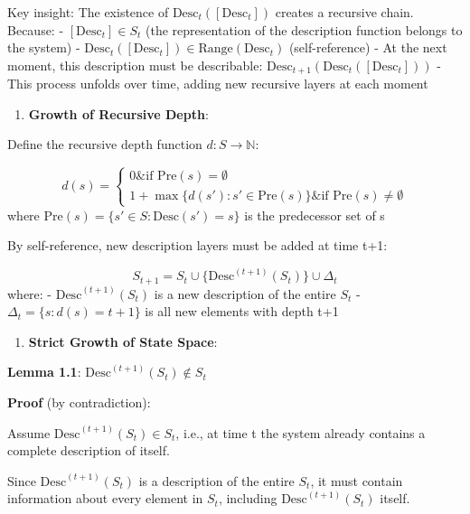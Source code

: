  Key insight: The existence of $\text{Desc}_t([\text{Desc}_t])$ creates a recursive chain. Because:
  - $[\text{Desc}_t] \in S_t$ (the representation of the description function belongs to the system)
  - $\text{Desc}_t([\text{Desc}_t]) \in \text{Range}(\text{Desc}_t)$ (self-reference)
  - At the next moment, this description must be describable: $\text{Desc}_{t+1}(\text{Desc}_t([\text{Desc}_t]))$
  - This process unfolds over time, adding new recursive layers at each moment

\begin{enumerate}
\item \textbf{Growth of Recursive Depth}:
\end{enumerate}
  Define the recursive depth function $d: S \to \mathbb{N}$:
  
\begin{equation}
d(s) = \begin{cases}
0 \& \text{if } \text{Pre}(s) = \emptyset \\
1 + \max\{d(s'): s' \in \text{Pre}(s)\} \& \text{if } \text{Pre}(s) \neq \emptyset
\end{cases}
\end{equation}
  where $\text{Pre}(s) = \{s' \in S: \text{Desc}(s') = s\}$ is the predecessor set of s
  
  By self-reference, new description layers must be added at time t+1:
  
\begin{equation}
S_{t+1} = S_t \cup \{\text{Desc}^{(t+1)}(S_t)\} \cup \Delta_t
\end{equation}
  where:
  - $\text{Desc}^{(t+1)}(S_t)$ is a new description of the entire $S_t$
  - $\Delta_t = \{s: d(s) = t+1\}$ is all new elements with depth t+1
  
\begin{enumerate}
\item \textbf{Strict Growth of State Space}:
\end{enumerate}
  \textbf{Lemma 1.1}: $\text{Desc}^{(t+1)}(S_t) \notin S_t$
\label{lem:1.1}
  
  \textbf{Proof} (by contradiction):
  
  Assume $\text{Desc}^{(t+1)}(S_t) \in S_t$, i.e., at time t the system already contains a complete description of itself.
  
  Since $\text{Desc}^{(t+1)}(S_t)$ is a description of the entire $S_t$, it must contain information about every element in $S_t$, including $\text{Desc}^{(t+1)}(S_t)$ itself.
  
